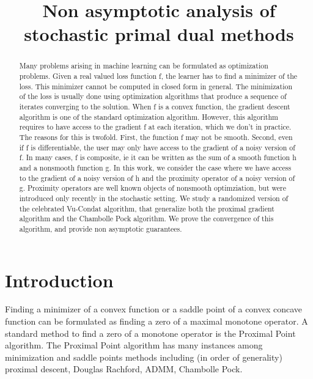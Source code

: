 \documentclass{article}
\title{Non asymptotic analysis of stochastic primal dual methods}
\newcommand{\1}{\mathbbm 1}
\newcommand{\asnote}[1]{\todo[color=green!20]{#1}}
\theoremstyle{definition}
\begin{document}
%
\maketitle
%



\begin{abstract} 
Many problems arising in machine learning can be formulated as optimization problems. Given a real valued loss function f, the learner has to find a minimizer of the loss. This minimizer cannot be computed in closed form in general. The minimization of the loss is usually done using optimization algorithms that produce a sequence of iterates converging to the solution. When f is a convex function, the gradient descent algorithm is one of the standard optimization algorithm. However, this algorithm requires to have access to the gradient f at each iteration, which we don’t in practice. The reasons for this is twofold. First, the function f may not be smooth. Second, even if f is differentiable, the user may only have access to the gradient of a noisy version of f.     
In many cases, f is composite, ie it can be written as the sum of a smooth function h and a nonsmooth function g. In this work, we consider the case where we have access to the gradient of a noisy version of h and the proximity operator of a noisy version of g. Proximity operators are well known objects of nonsmooth optimziation, but were introduced only recently in the stochastic setting. We study a randomized version of the celebrated Vu-Condat algorithm, that generalize both the proximal gradient algorithm and the Chambolle Pock algorithm. We prove the convergence of this algorithm, and provide non asymptotic guarantees. 
\end{abstract}

%
%

\section{Introduction}
\asnote{Comparision with Bach Balamurugan}
Finding a minimizer of a convex function or a saddle point of a convex concave function can be formulated as finding a zero of a maximal monotone operator. A standard method to find a zero of a monotone operator is the Proximal Point algorithm. The Proximal Point algorithm has many instances among minimization and saddle points methods including (in order of generality) proximal descent, Douglas Rachford, ADMM, Chambolle Pock.
\end{document}
